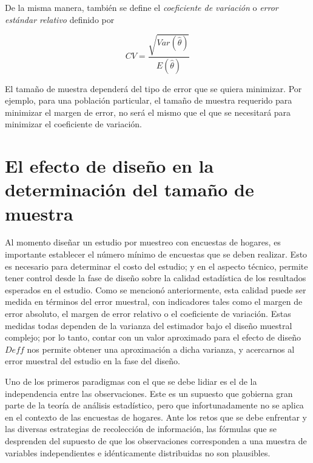 \documentclass[
  10pt,
  spanish,
]{book}
\begin{document}
De la misma manera, también se define el \emph{coeficiente de variación} o \emph{error estándar relativo} definido por

\begin{equation}
CV =  \frac{\sqrt{ Var(\hat{\theta})}}{E(\hat{\theta})}
\end{equation}

El tamaño de muestra dependerá del tipo de error que se quiera minimizar. Por ejemplo, para una población particular, el tamaño de muestra requerido para minimizar el margen de error, no será el mismo que el que se necesitará para minimizar el coeficiente de variación.

\hypertarget{el-efecto-de-diseuxf1o-en-la-determinaciuxf3n-del-tamauxf1o-de-muestra}{%
\section{El efecto de diseño en la determinación del tamaño de muestra}\label{el-efecto-de-diseuxf1o-en-la-determinaciuxf3n-del-tamauxf1o-de-muestra}}

Al momento diseñar un estudio por muestreo con encuestas de hogares, es importante establecer el número mínimo de encuestas que se deben realizar. Esto es necesario para determinar el costo del estudio; y en el aspecto técnico, permite tener control desde la fase de diseño sobre la calidad estadística de los resultados esperados en el estudio. Como se mencionó anteriormente, esta calidad puede ser medida en términos del error muestral, con indicadores tales como el margen de error absoluto, el margen de error relativo o el coeficiente de variación. Estas medidas todas dependen de la varianza del estimador bajo el diseño muestral complejo; por lo tanto, contar con un valor aproximado para el efecto de diseño \(Deff\) nos permite obtener una aproximación a dicha varianza, y acercarnos al error muestral del estudio en la fase del diseño.

Uno de los primeros paradigmas con el que se debe lidiar es el de la independencia entre las observaciones. Este es un supuesto que gobierna gran parte de la teoría de análisis estadístico, pero que infortunadamente no se aplica en el contexto de las encuestas de hogares. Ante los retos que se debe enfrentar y las diversas estrategias de recolección de información, las fórmulas que se desprenden del supuesto de que los observaciones corresponden a una muestra de variables independientes e idénticamente distribuidas no son plausibles.
\end{document}
